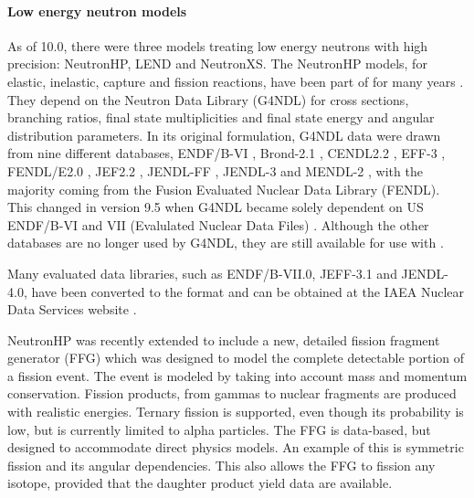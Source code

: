 \paragraph{Low energy neutron models}
As of \Gfour{} 10.0, there were three models treating low energy neutrons with
high precision: NeutronHP, LEND and NeutronXS.  The NeutronHP models, for
elastic, inelastic, capture and fission reactions, have been part of \Gfour{}
for many years \cite{bib:G4}.  They depend on the \Gfour{} Neutron Data Library 
(G4NDL) for cross sections, branching ratios, final state multiplicities and
final state energy and angular distribution parameters.  In its original 
formulation, G4NDL data were drawn from nine different databases,
ENDF/B-VI \cite{hadbib:ENDF}, Brond-2.1 \cite{hadbib:BROND}, CENDL2.2
\cite{hadbib:CENDL}, EFF-3 \cite{hadbib:EFF}, FENDL/E2.0 \cite{hadbib:FENDL},
JEF2.2 \cite{hadbib:JEF}, JENDL-FF \cite{hadbib:JENDLFF}, JENDL-3 
\cite{hadbib:JENDL3} and MENDL-2 \cite{hadbib:MENDL}, 
with the majority coming from the Fusion Evaluated Nuclear Data Library (FENDL).  
This changed in \Gfour{} version 9.5 when G4NDL became solely dependent on US 
ENDF/B-VI and VII (Evalulated Nuclear Data Files) \cite{hadbib:ENDF}. Although 
the other databases are no longer used by G4NDL, they are still available for 
use with \Gfour{}.
  
Many evaluated data libraries, such as ENDF/B-VII.0, JEFF-3.1 and JENDL-4.0, 
have been converted to the \Gfour{} format \cite{hadbib:mendoza} and can be 
obtained at the IAEA Nuclear Data Services website \cite{hadbib:IAEA} .  

NeutronHP was recently extended to include a new, detailed fission fragment 
generator (FFG) which was designed to model the complete detectable portion of
a fission event.  The event is modeled by taking into account mass and momentum 
conservation.  Fission products, from gammas to nuclear fragments are produced 
with realistic energies.  Ternary fission is
supported, even though its probability is low, but is currently limited to 
alpha particles.  The FFG is data-based, but designed to accommodate direct
physics models.  An example of this is symmetric fission and its angular 
dependencies.  This also allows the FFG to fission any isotope, provided that
the daughter product yield data are available. 

